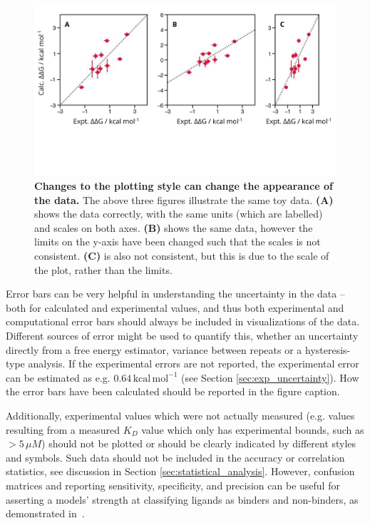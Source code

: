 \documentclass[9pt,bestpractices]{livecoms}
\begin{document}
\begin{figure}
    \centering
    \includegraphics[width=0.95\linewidth]{figures/reporting/plotting-basics.pdf}
    \caption{\textbf{Changes to the plotting style can change the appearance of the data.} The above three figures illustrate the same toy data. \textbf{(A)} shows the data correctly, with the same units (which are labelled) and scales on both axes. \textbf{(B)} shows the same data, however the limits on the y-axis have been changed such that the scales is not consistent. \textbf{(C)} is also not consistent, but this is due to the scale of the plot, rather than the limits.}
    \label{fig:plotting-basics}
\end{figure}

Error bars can be very helpful in understanding the uncertainty in the data -- both for calculated and experimental values, and thus both experimental and computational error bars should always be included in visualizations of the data. Different sources of error might be used to quantify this, whether an uncertainty directly from a free energy estimator, variance between repeats or a hysteresis-type analysis. If the experimental errors are not reported, the experimental error can be estimated as e.g. $0.64\,\mathrm{kcal\,mol^{-1}}$ (see Section \ref{sec:exp_uncertainty}). How the error bars have been calculated should be reported in the figure caption.


Additionally, experimental values which were not actually measured (e.g. values resulting from a measured $K_D$ value which only has experimental bounds, such as $> 5\,\mu M$) should not be plotted or should be clearly indicated by different styles and symbols. Such data should not be included in the accuracy or correlation statistics, see  discussion in Section \ref{sec:statistical_analysis}. However, confusion matrices and reporting sensitivity, specificity, and precision can be useful for asserting a models' strength at classifying ligands as binders and non-binders, as demonstrated in~\cite{hauserPredictingResistanceClinical2018}.
\end{document}
